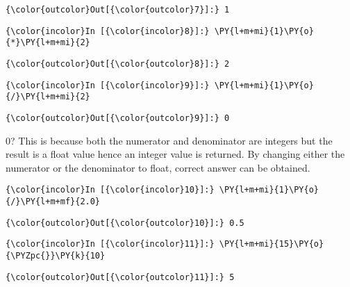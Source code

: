             \begin{Verbatim}[commandchars=\\\{\}]
{\color{outcolor}Out[{\color{outcolor}7}]:} 1
\end{Verbatim}
        
    \begin{Verbatim}[commandchars=\\\{\}]
{\color{incolor}In [{\color{incolor}8}]:} \PY{l+m+mi}{1}\PY{o}{*}\PY{l+m+mi}{2}
\end{Verbatim}

            \begin{Verbatim}[commandchars=\\\{\}]
{\color{outcolor}Out[{\color{outcolor}8}]:} 2
\end{Verbatim}
        
    \begin{Verbatim}[commandchars=\\\{\}]
{\color{incolor}In [{\color{incolor}9}]:} \PY{l+m+mi}{1}\PY{o}{/}\PY{l+m+mi}{2}
\end{Verbatim}

            \begin{Verbatim}[commandchars=\\\{\}]
{\color{outcolor}Out[{\color{outcolor}9}]:} 0
\end{Verbatim}
        
    0? This is because both the numerator and denominator are integers but
the result is a float value hence an integer value is returned. By
changing either the numerator or the denominator to float, correct
answer can be obtained.

    \begin{Verbatim}[commandchars=\\\{\}]
{\color{incolor}In [{\color{incolor}10}]:} \PY{l+m+mi}{1}\PY{o}{/}\PY{l+m+mf}{2.0}
\end{Verbatim}

            \begin{Verbatim}[commandchars=\\\{\}]
{\color{outcolor}Out[{\color{outcolor}10}]:} 0.5
\end{Verbatim}
        
    \begin{Verbatim}[commandchars=\\\{\}]
{\color{incolor}In [{\color{incolor}11}]:} \PY{l+m+mi}{15}\PY{o}{\PYZpc{}}\PY{k}{10}
\end{Verbatim}

            \begin{Verbatim}[commandchars=\\\{\}]
{\color{outcolor}Out[{\color{outcolor}11}]:} 5
\end{Verbatim}
        
